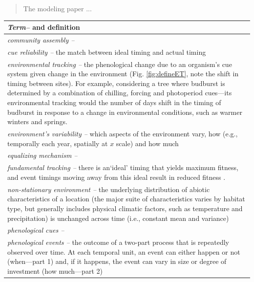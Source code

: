 \documentclass[11pt,letterpaper]{article}
\begin{document}
\begin{abstract} 
The modeling paper ... 
\end{abstract}


\begin{center}
\begin{table}
\begin{tabular}{ p{12 cm}  }
\hline \hline
\emph{Term--} and definition\\ %
\hline 
\emph{community assembly --}  \\
\emph{cue reliability --} the match between ideal timing and actual timing \citep{donald2013,bonamour2019} \\ 
\emph{environmental tracking --}  the phenological change due to an organism's cue system given change in the environment  (Fig. \ref{fig:defineET}, note the shift in timing between sites). For example, considering a tree where budburst is determined by a combination of chilling, forcing and photoperiod cues---its environmental tracking would the number of days shift in the timing of budburst in response to a change in environmental conditions, such as warmer winters and springs. \\ %
\emph{environment's variability --} which aspects of the environment vary, how (e.g., temporally each year, spatially at $x$ scale) and how much \\
\emph{equalizing mechanism --} \\
\emph{fundamental tracking --} there is an`ideal' timing that yields maximum fitness, and event timings moving away from this ideal result in reduced fitness \citep[a foundational concept of the trophic mismatch literature,][]{vissergienapp2019}.\\
\emph{non-stationary environment --} the underlying distribution of abiotic characteristics of a location (the major suite of characteristics varies by habitat type, but generally includes physical climatic factors, such as temperature and precipitation) is unchanged across time (i.e., constant mean and variance) \\
\emph{phenological cues --} \\
\emph{phenological events --} the outcome of a two-part process that is repeatedly observed over time. At each temporal unit, an event can either happen or not (when---part 1) and, if it happens, the event can vary in size or degree of investment (how much---part 2) \\

\end{tabular}
\end{table}
\end{center}
\end{document}
